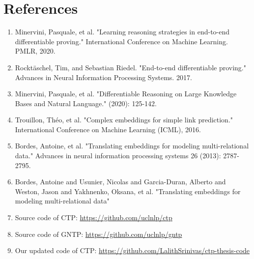 \documentclass[Other]{iitddiss}
\begin{document}

\chapter{References}

\begin{enumerate}
\item Minervini, Pasquale, et al. "Learning reasoning strategies in end-to-end differentiable proving." International Conference on Machine Learning. PMLR, 2020.
\item Rocktäschel, Tim, and Sebastian Riedel. "End-to-end differentiable proving." Advances in Neural Information Processing Systems. 2017.
\item Minervini, Pasquale, et al. "Differentiable Reasoning on Large Knowledge Bases and Natural Language." (2020): 125-142.
\item Trouillon, Théo, et al. "Complex embeddings for simple link prediction." International Conference on Machine Learning (ICML), 2016.
\item Bordes, Antoine, et al. "Translating embeddings for modeling multi-relational data." Advances in neural information processing systems 26 (2013): 2787-2795.
\item Bordes, Antoine and Usunier, Nicolas and Garcia-Duran, Alberto and Weston, Jason and Yakhnenko, Oksana, et al. "Translating embeddings for modeling multi-relational data"
\item Source code of CTP: \url{https://github.com/uclnlp/ctp}
\item Source code of GNTP: \url{https://github.com/uclnlp/gntp}
\item Our updated code of CTP: \url{https://github.com/LalithSrinivas/ctp-thesis-code}
\end{enumerate}
\end{document}
